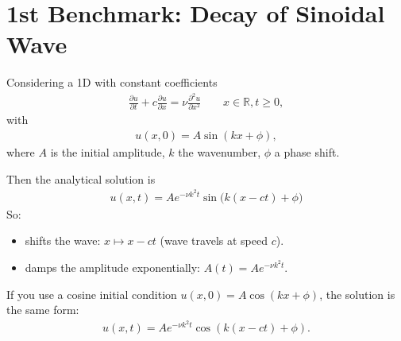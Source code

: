 \documentclass[letterpaper,10pt,english,openany,oneside]{jupyterBook}
\begin{document}
\section{1st Benchmark: Decay of Sinoidal Wave}
\label{\detokenize{Refs/LBM-Study/FDM-Belloti/FDM-LBM-Diffusive:st-benchmark-decay-of-sinoidal-wave}}
\sphinxAtStartPar
Considering a 1D  with constant coefficients
\begin{equation*}
\begin{split}
\frac{\partial u}{\partial t}+c\frac{\partial u}{\partial x} = \nu\frac{\partial^2 u}{\partial x^2} \qquad x\in\mathbb{R}, t\ge 0,
\end{split}
\end{equation*}
\sphinxAtStartPar
with 
\begin{equation*}
\begin{split}
u(x,0)=A\sin(kx+\phi),
\end{split}
\end{equation*}
\sphinxAtStartPar
where \(A\) is the initial amplitude, \(k\) the wavenumber, \(\phi\) a phase shift.

\sphinxAtStartPar
Then the analytical solution is
\begin{equation*}
\begin{split}
\boxed{u(x,t)=Ae^{-\nu k^{2}t}\sin\big(k(x-ct)+\phi\big) }
\end{split}
\end{equation*}
\sphinxAtStartPar
So:
\begin{itemize}
\item {} 
\sphinxAtStartPar
{} shifts the wave: \(x \mapsto x-ct\) (wave travels at speed \(c\)).

\item {} 
\sphinxAtStartPar
{} damps the amplitude exponentially: \(A(t)=Ae^{-\nu k^{2}t}\).

\end{itemize}

\sphinxAtStartPar
If you use a cosine initial condition \(u(x,0)=A\cos(kx+\phi)\), the solution is the same form:
\begin{equation*}
\begin{split}
u(x,t)=Ae^{-\nu k^{2}t}\cos\left( k(x-ct)+\phi \right).
\end{split}
\end{equation*}
\end{document}
